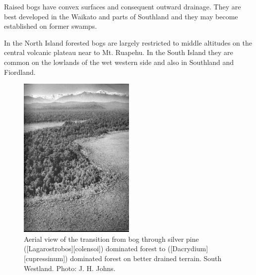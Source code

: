 Raised bogs have convex surfaces and consequent outward drainage.
They are best developed in the Waikato and parts of Southland and they may become established on former swamps.

In the North Island forested bogs are largely restricted to middle altitudes on the central volcanic plateau near to Mt. Ruapehu.
In the South Island they are common on the lowlands of the wet western side and also in Southland and Fiordland.

\begin{figure}
	\includegraphics[width=0.5\textwidth]{graphics/figure68transition.jpg}
	\centering
	\caption[Aerial view of the transition from pakihi bog through silver pine to rimu]{Aerial view of the transition from  bog through silver pine ([Lagarostrobos][colensoi]) dominated forest to  ([Dacrydium][cupressinum]) dominated forest on better drained terrain.
South Westland.
	Photo: J. H. Johns.}%
	\label{fig:68transition}
\end{figure}


